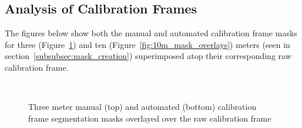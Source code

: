 \subsection{Analysis of Calibration Frames}\label{subsec:analysis-of-calibration-frames}

The figures below show both the manual and automated calibration frame masks for
three (Figure~\ref{fig:3m_mask_overlays}) and ten (Figure~\ref{fig:10m_mask_overlays})
meters (seen in section~\ref{subsubsec:mask_creation}) superimposed atop their
corresponding raw calibration frame.

\vspace{1cm}

\begin{figure}[htbp]
    \centering
    \\[1mm]
    \caption{Three meter manual (top) and automated (bottom) calibration frame segmentation masks overlayed over
    the raw calibration frame}
    \label{fig:3m_mask_overlays}
\end{figure}

